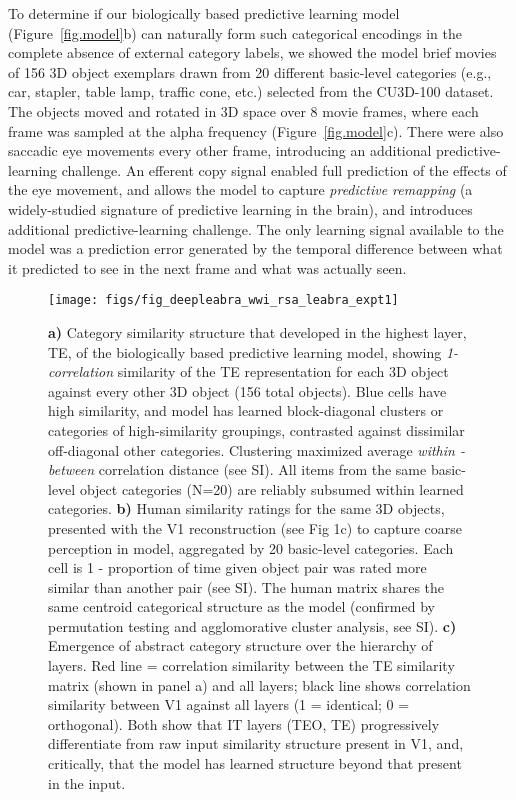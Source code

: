 \documentclass[12pt,twoside]{naturefigs}  %
\newif\myifpdf
\begin{document}
To determine if our biologically based predictive learning model (Figure~\ref{fig.model}b) can naturally form such categorical encodings in the complete absence of external category labels, we showed the model brief movies of 156 3D object exemplars drawn from 20 different basic-level categories (e.g., car, stapler, table lamp, traffic cone, etc.) selected from the CU3D-100 dataset\cite{OReillyWyatteHerdEtAl13}.  The objects moved and rotated in 3D space over 8 movie frames, where each frame was sampled at the alpha frequency (Figure~\ref{fig.model}c).  There were also saccadic eye movements every other frame, introducing an additional predictive-learning challenge.  An efferent copy signal enabled full prediction of the effects of the eye movement, and allows the model to capture {\em predictive remapping} (a widely-studied signature of predictive learning in the brain)\cite{DuhamelColbyGoldberg92,CavanaghHuntAfrazEtAl10}, and introduces additional predictive-learning challenge.  The only learning signal available to the model was a prediction error generated by the temporal difference between what it predicted to see in the next frame and what was actually seen.

\begin{figure}
  \centering\texttt{[image: figs/fig\_deepleabra\_wwi\_rsa\_leabra\_expt1]}
  \caption{\small \protect{} {\bf a)} Category similarity structure that developed in the highest layer, TE, of the biologically based predictive learning model, showing {\em 1-correlation} similarity of the TE representation for each 3D object against every other 3D object (156 total objects). Blue cells have high similarity, and model has learned block-diagonal clusters or categories of high-similarity groupings, contrasted against dissimilar off-diagonal other categories.  Clustering maximized average {\em within - between} correlation distance (see SI).  All items from the same basic-level object categories (N=20) are reliably subsumed within learned categories. {\bf b)} Human similarity ratings for the same 3D objects, presented with the V1 reconstruction (see Fig 1c) to capture coarse perception in model, aggregated by 20 basic-level categories.  Each cell is 1 - proportion of time given object pair was rated more similar than another pair (see SI).  The human matrix shares the same centroid categorical structure as the model (confirmed by permutation testing and agglomorative cluster analysis, see SI).  {\bf c)} Emergence of abstract category structure over the hierarchy of layers.  Red line = correlation similarity between the TE similarity matrix (shown in panel a) and all layers; black line shows correlation similarity between V1 against all layers (1 = identical; 0 = orthogonal). Both show that IT layers (TEO, TE) progressively differentiate from raw input similarity structure present in V1, and, critically, that the model has learned structure beyond that present in the input.}
  \label{fig.rsa}
\end{figure}
\end{document}
